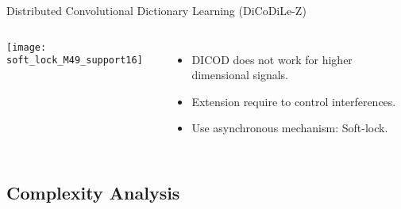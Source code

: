 \documentclass[prez_tpt]{subfiles}
\begin{document}
\begin{frame}{Distributed Convolutional Dictionary Learning (DiCoDiLe-Z)\\}

\begin{columns}[c]
    \texttt{[image: soft\_lock\_M49\_support16]}
    \begin{itemize}[<+->]\itemsep1em
        \item DICOD does not work for higher dimensional signals.
        \item Extension require to control interferences. 
        \item Use asynchronous mechanism: Soft-lock.
    \end{itemize}
\end{columns}

\end{frame}



%
%


\subsection{Complexity Analysis}
\end{document}
